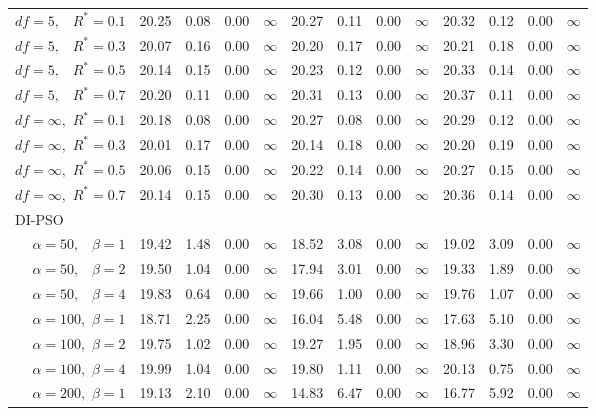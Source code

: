 \documentclass[12pt]{article}
\begin{document}
\begin{table}[ht]
{\begin{tabular}{r|rrrr|rrrr|rrrr}
  $df = 5,\enspace$ $R^* =0.1$ & 20.25 & 0.08 & 0.00 & $\infty$ & 20.27 & 0.11 & 0.00 & $\infty$ & 20.32 & 0.12 & 0.00 & $\infty$ \\ 
  $df = 5,\enspace$ $R^* =0.3$ & 20.07 & 0.16 & 0.00 & $\infty$ & 20.20 & 0.17 & 0.00 & $\infty$ & 20.21 & 0.18 & 0.00 & $\infty$ \\ 
  $df = 5,\enspace$ $R^* =0.5$ & 20.14 & 0.15 & 0.00 & $\infty$ & 20.23 & 0.12 & 0.00 & $\infty$ & 20.33 & 0.14 & 0.00 & $\infty$ \\ 
  $df = 5,\enspace$ $R^* =0.7$ & 20.20 & 0.11 & 0.00 & $\infty$ & 20.31 & 0.13 & 0.00 & $\infty$ & 20.37 & 0.11 & 0.00 & $\infty$ \\ 
  $df = \infty,$ $R^* =0.1$ & 20.18 & 0.08 & 0.00 & $\infty$ & 20.27 & 0.08 & 0.00 & $\infty$ & 20.29 & 0.12 & 0.00 & $\infty$ \\ 
  $df = \infty,$ $R^* =0.3$ & 20.01 & 0.17 & 0.00 & $\infty$ & 20.14 & 0.18 & 0.00 & $\infty$ & 20.20 & 0.19 & 0.00 & $\infty$ \\ 
  $df = \infty,$ $R^* =0.5$ & 20.06 & 0.15 & 0.00 & $\infty$ & 20.22 & 0.14 & 0.00 & $\infty$ & 20.27 & 0.15 & 0.00 & $\infty$ \\ 
  $df = \infty,$ $R^* =0.7$ & 20.14 & 0.15 & 0.00 & $\infty$ & 20.30 & 0.13 & 0.00 & $\infty$ & 20.36 & 0.14 & 0.00 & $\infty$ \\ 
\hline
\multicolumn{1}{l|}{DI-PSO} &&&&&&&&&&&&\\
  $\alpha = 50,\enspace$ $\beta =1$ & 19.42 & 1.48 & 0.00 & $\infty$ & 18.52 & 3.08 & 0.00 & $\infty$ & 19.02 & 3.09 & 0.00 & $\infty$ \\ 
  $\alpha = 50,\enspace$ $\beta =2$ & 19.50 & 1.04 & 0.00 & $\infty$ & 17.94 & 3.01 & 0.00 & $\infty$ & 19.33 & 1.89 & 0.00 & $\infty$ \\ 
  $\alpha = 50,\enspace$ $\beta =4$ & 19.83 & 0.64 & 0.00 & $\infty$ & 19.66 & 1.00 & 0.00 & $\infty$ & 19.76 & 1.07 & 0.00 & $\infty$ \\ 
  $\alpha = 100,$ $\beta =1$ & 18.71 & 2.25 & 0.00 & $\infty$ & 16.04 & 5.48 & 0.00 & $\infty$ & 17.63 & 5.10 & 0.00 & $\infty$ \\ 
  $\alpha = 100,$ $\beta =2$ & 19.75 & 1.02 & 0.00 & $\infty$ & 19.27 & 1.95 & 0.00 & $\infty$ & 18.96 & 3.30 & 0.00 & $\infty$ \\ 
  $\alpha = 100,$ $\beta =4$ & 19.99 & 1.04 & 0.00 & $\infty$ & 19.80 & 1.11 & 0.00 & $\infty$ & 20.13 & 0.75 & 0.00 & $\infty$ \\ 
  $\alpha = 200,$ $\beta =1$ & 19.13 & 2.10 & 0.00 & $\infty$ & 14.83 & 6.47 & 0.00 & $\infty$ & 16.77 & 5.92 & 0.00 & $\infty$ \\ 

\end{tabular}}
\end{table}
\end{document}
